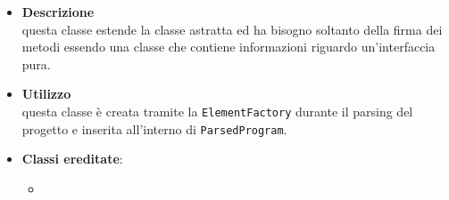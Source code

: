 \label{\nogloxy{swedesigner::server::project::ParsedInterface}}
\begin{itemize}
\item \textbf{Descrizione}\\
questa classe estende la classe astratta  ed ha bisogno soltanto della firma dei metodi essendo una classe che contiene informazioni riguardo un'interfaccia pura.
\item \textbf{Utilizzo}\\
questa classe è creata tramite la \texttt{ElementFactory} durante il parsing del progetto e inserita all'interno di \texttt{ParsedProgram}.
\item \textbf{Classi ereditate}:
\begin{itemize}
\item \hyperref[\nogloxy{swedesigner::server::project::ParsedType}]{}
\end{itemize}
\end{itemize}

